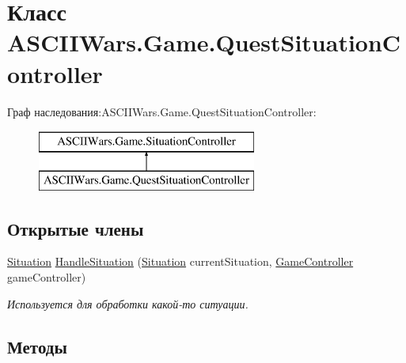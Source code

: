 \hypertarget{class_a_s_c_i_i_wars_1_1_game_1_1_quest_situation_controller}{}\section{Класс A\+S\+C\+I\+I\+Wars.\+Game.\+Quest\+Situation\+Controller}
\label{class_a_s_c_i_i_wars_1_1_game_1_1_quest_situation_controller}
Граф наследования\+:A\+S\+C\+I\+I\+Wars.\+Game.\+Quest\+Situation\+Controller\+:\begin{figure}[H]
\begin{center}
\leavevmode
\includegraphics[height=2.000000cm]{class_a_s_c_i_i_wars_1_1_game_1_1_quest_situation_controller}
\end{center}
\end{figure}
\subsection*{Открытые члены}
\begin{DoxyCompactItemize}
\item 
\hyperlink{class_a_s_c_i_i_wars_1_1_game_1_1_situation}{Situation} \hyperlink{class_a_s_c_i_i_wars_1_1_game_1_1_quest_situation_controller_aca719e6a0e79c492e212358b0bb0bc24}{Handle\+Situation} (\hyperlink{class_a_s_c_i_i_wars_1_1_game_1_1_situation}{Situation} current\+Situation, \hyperlink{class_a_s_c_i_i_wars_1_1_game_1_1_game_controller}{Game\+Controller} game\+Controller)
\begin{DoxyCompactList}\small\item\em Используется для обработки какой-\/то ситуации. \end{DoxyCompactList}\end{DoxyCompactItemize}


\subsection{Методы}
\hypertarget{class_a_s_c_i_i_wars_1_1_game_1_1_quest_situation_controller_aca719e6a0e79c492e212358b0bb0bc24}{}\label{class_a_s_c_i_i_wars_1_1_game_1_1_quest_situation_controller_aca719e6a0e79c492e212358b0bb0bc24} 
